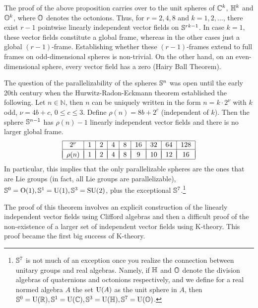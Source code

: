 \begin{rem}
    The proof of the above proposition carries over to the unit spheres of $\mathbb{C}^k$, $\mathbb{H}^k$ and $\mathbb{O}^k$, where $\mathbb{O}$ denotes the octonions. Thus, for $r=2,4,8$ and $k=1,2,\ldots$, there exist $r-1$ pointwise linearly independent vector fields on $\mathbb{S}^{rk-1}$. In case $k=1$, these vector fields constitute a global frame, whereas in the other cases just a global $(r-1)$-frame. Establishing whether these $(r-1)$-frames extend to full frames on odd-dimensional spheres is non-trivial. On the other hand, on an even-dimensional sphere, every vector field has a zero (Hairy Ball Theorem).

    The question of the parallelizability of the spheres $\mathbb{S}^n$ was open until the early 20th century when the Hurwitz-Radon-Eckmann theorem established the following. Let $n\in\mathbb{N}$, then $n$ can be uniquely written in the form $n=k\cdot 2^\nu$ with $k$ odd, $\nu=4b+c$, $0\leq c\leq 3$. Define $\rho(n)=8b+2^c$ (independent of $k$). Then the sphere $\mathbb{S}^{n-1}$ has $\rho(n)-1$ linearly independent vector fields and there is no larger global frame. 
    \[\begin{tabular}{|c|c|c|c|c|c|c|c|c|}
    \hline 
    $2^\nu$ & 1 & 2 & 4 & 8 & 16 & 32 & 64 & 128\tabularnewline
    \hline &&&&&&&&\\[-1em]
    $\rho(n)$ &1 & 2 & 4 & 8 & 9 & 10 & 12 & 16\tabularnewline
    \hline 
    \end{tabular}\]
    In particular, this implies that the only parallelizable spheres are the ones that are Lie groups (in fact, all Lie groups are parallelizable), $\mathbb{S}^0=\rm{O}(1),\mathbb{S}^1=\rm{U}(1),\mathbb{S}^3=\rm{SU}(2)$, plus the exceptional $\mathbb{S}^7$.\footnote{$\mathbb{S}^7$ is not much of an exception once you realize the connection between unitary groups and real algebras. Namely, if $\mathbb{H} $ and $\mathbb{O}$ denote the division algebras of quaternions and octonions respectively, and we define for a real normed algebra $A$ the set ${\rm U}(A)$ as the unit sphere in $A$, then $\mathbb{S}^0=\rm{U}(\mathbb{R} ),\mathbb{S}^1=\rm{U}(\mathbb{C}),\mathbb{S}^3=\rm{U}(\mathbb{H}),\mathbb{S}^7=\rm{U}(\mathbb{O})$.}
    
    The proof of this theorem involves an explicit construction of the linearly independent vector fields using Clifford algebras and then a difficult proof of the non-existence of a larger set of independent vector fields using K-theory. This proof became the first big success of K-theory.
\end{rem}



